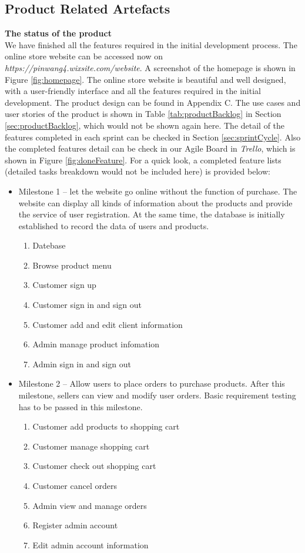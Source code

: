\documentclass{report}
\begin{document}
\subsection{Product Related Artefacts}
\textbf{The status of the product}
\\
We have finished all the features required in the initial development process. The online store website can be accessed now on \textit{https://pinwang4.wixsite.com/website}. A screenshot of the homepage is shown in Figure \ref{fig:homepage}. The online store website is beautiful and well designed, with a user-friendly interface and all the features required in the initial development. The product design can be found in Appendix C. The use cases and user stories of the product is shown in Table \ref{tab:productBacklog} in Section \ref{sec:productBacklog}, which would not be shown again here. The detail of the features completed in each sprint can be checked in Section \ref{sec:sprintCycle}. Also the completed features detail can be check in our Agile Board in \textit{Trello}, which is shown in Figure \ref{fig:doneFeature}. For a quick look, a completed feature lists (detailed tasks breakdown would not be included here) is provided below:
\\
\begin{itemize}
  \item Milestone 1 -- let the website go online without the function of purchase. The website can display all kinds of information about the products and provide the service of user registration. At the same time, the database is initially established to record the data of users and products.
  \begin{enumerate}
    \item Datebase
    \item Browse product menu
    \item Customer sign up
    \item Customer sign in and sign out
    \item Customer add and edit client information
    \item Admin manage product infomation
    \item Admin sign in and sign out
  \end{enumerate}
  \item Milestone 2 -- Allow users to place orders to purchase products. After this milestone, sellers can view and modify user orders. Basic requirement testing has to be passed in this milestone.
  \begin{enumerate}
    \item Customer add products to shopping cart
    \item Customer manage shopping cart
    \item Customer check out shopping cart
    \item Customer cancel orders
    \item Admin view and manage orders
    \item Register admin account
    \item Edit admin account information
  \end{enumerate}
\end{itemize}
\end{document}
